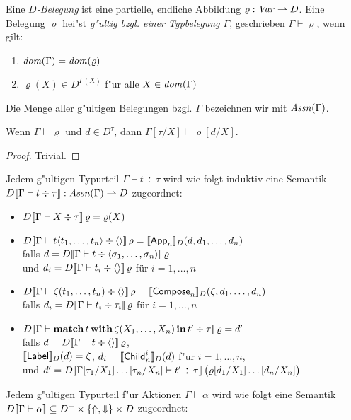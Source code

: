 \documentclass[%
  12pt,%
  a4paper,%
]{article}
\newcommand{\match}[3]{\textbf{match}\,{#1}\,\textbf{with}\,{#2}\,\textbf{in}\,{#3}}
\newcommand{\Tj}[3]{{#1}\vdash{#2}\div{#3}}
\begin{document}
Eine \emph{$D$-Belegung} ist eine partielle, endliche Abbildung $\varrho: \mathit{Var} \rightharpoonup D$. Eine Belegung
$\varrho$ hei"st \emph{g"ultig bzgl. einer Typbelegung $\Gamma$}, geschrieben $\Gamma \vdash \varrho$,
wenn gilt:
\begin{enumerate}
\item $\mathit{dom}(\Gamma) = \mathit{dom}(\varrho)$
\item $\varrho(X) \in D^{\Gamma(X)}$ f"ur alle $X \in \mathit{dom}(\Gamma)$
\end{enumerate}
Die Menge aller g"ultigen Belegungen bzgl. $\Gamma$ bezeichnen wir mit $\mathit{Assn}(\Gamma)$.
\begin{lemma}
  Wenn $\Gamma \vdash \varrho$ und $d \in D^\tau$, dann $\Gamma[\tau/X] \vdash \varrho[d/X]$.
\end{lemma}
\begin{proof}
  Trivial.
\end{proof}
Jedem g"ultigen Typurteil $\Tj{\Gamma}{t}{\tau}$ wird wie folgt induktiv
eine Semantik $D\sem{\Tj{\Gamma}{t}{\tau}}: \Assn(\Gamma) \pto D$ zugeordnet:
\begin{itemize}
\item $D\sem{\Tj{\Gamma}{X}{\tau}}\,\varrho = \varrho(X)$
\item $D\sem{\Tj{\Gamma}{t \langle t_1,\ldots,t_n \rangle}{\langle \rangle}}\,\varrho
  = \sem{\App_n}_D(d, d_1, \ldots, d_n)$ \\
  falls $d = D\sem{\Tj{\Gamma}{t}{\langle\sigma_1,\ldots,\sigma_n\rangle}}\,\varrho$ \\
  und $d_i = D\sem{\Tj{\Gamma}{t_i}{\langle \rangle}}\,\varrho$ f\"ur $i=1,\ldots,n$
\item $D\sem{\Tj{\Gamma}{\zeta(t_1,\ldots,t_n)}{\langle \rangle}}\,\varrho
  = \sem{\Compose_n}_D(\zeta,d_1,\ldots,d_n)$ \\
  falls $d_i = D\sem{\Tj{\Gamma}{t_i}{\tau_i}}\,\varrho$ f\"ur $i=1,\ldots,n$
\item $D\sem{\Tj{\Gamma}{\match{t}{\zeta(X_1,\ldots,X_n)}{t'}}{\tau}}\,\varrho
  = d'$ \\
  falls $d = D\sem{\Tj{\Gamma}{t}{\langle \rangle}}\,\varrho$, \\
  $[\![\mathsf{Label}]\!]_D(d) = \zeta$, $d_i = [\![\mathsf{Child}_n^i]\!]_D(d)$ f"ur $i=1,\ldots,n$, \\
  und $d' = D\sem{\Tj{\Gamma[\tau_1/X_1]\ldots[\tau_n/X_n]}{t'}{\tau}}\,\bigl(\varrho[d_1/X_1]\ldots[d_n/X_n]\bigr)$
\end{itemize}
Jedem g"ultigen Typurteil f"ur Aktionen $\Gamma \vdash \alpha$ wird wie folgt eine Semantik
$D[\![\Gamma \vdash \alpha]\!] \subseteq D^+ \times \{\Uparrow,\Downarrow\} \times D$ zugeordnet:
\end{document}
